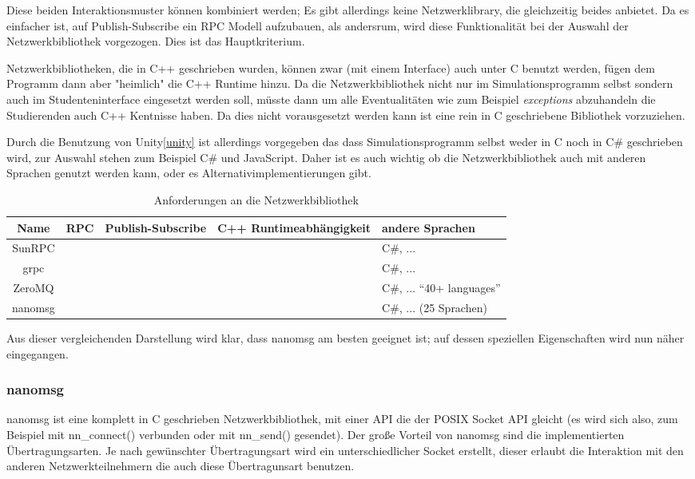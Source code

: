 Diese beiden Interaktionsmuster k{\"{o}}nnen kombiniert werden; Es gibt allerdings keine Netzwerklibrary, die gleichzeitig beides anbietet.
Da es einfacher ist, auf Publish-Subscribe ein RPC Modell aufzubauen, als andersrum, wird diese Funktionalit{\"{a}}t bei der Auswahl der
Netzwerkbibliothek vorgezogen. Dies ist das Hauptkriterium.

Netzwerkbibliotheken, die in C++ geschrieben wurden, k{\"{o}}nnen zwar (mit einem Interface) auch unter C benutzt 
werden, f{\"{u}}gen dem Programm dann aber "heimlich" die C++ Runtime hinzu. Da die Netzwerkbibliothek nicht
nur im Simulationsprogramm selbst sondern auch im Studenteninterface eingesetzt werden soll, m{\"{u}}sste dann
um alle Eventualit{\"{a}}ten wie zum Beispiel \textit{exceptions} abzuhandeln die Studierenden auch C++
Kentnisse haben. Da dies nicht vorausgesetzt werden kann ist eine rein in C geschriebene Bibliothek vorzuziehen.

Durch die Benutzung von Unity\ref{unity} ist allerdings vorgegeben das dass Simulationsprogramm selbst weder in C noch
in C\# geschrieben wird, zur Auswahl stehen zum Beispiel C\# und JavaScript. Daher ist es auch wichtig ob die Netzwerkbibliothek
auch mit anderen Sprachen genutzt werden kann, oder es Alternativimplementierungen gibt.

\clearpage %
\begin{table}[h]
\centering
\begin{tabu}{c | c | c | c | p{5cm}}
	\toprule
	Name & RPC & Publish-Subscribe & C++ Runtimeabh{\"{a}}ngigkeit & andere Sprachen \\
	\midrule
	SunRPC & \checkmark & \xmark & \checkmark & C\#, ... \\
	grpc\cite{grpc} & \checkmark & \xmark & \xmark & C\#, ... \\
	ZeroMQ\cite{zeromq} & \xmark & \checkmark & \xmark & C\#, ... \enquote{40+ languages} \\
	nanomsg\cite{nanomsg} & \xmark & \checkmark & \checkmark & C\#, ... (25 Sprachen) \\
	\bottomrule
\end{tabu}
\caption{Anforderungen an die Netzwerkbibliothek}
\end{table}

Aus dieser vergleichenden Darstellung wird klar, dass nanomsg am besten geeignet ist; auf dessen speziellen Eigenschaften wird nun n{\"{a}}her eingegangen.

\subsubsection{nanomsg}
nanomsg ist eine komplett in C geschrieben Netzwerkbibliothek, mit einer API die der POSIX Socket API gleicht (es wird sich also, zum Beispiel mit nn\_connect() verbunden oder mit nn\_send() gesendet).
Der gro{\ss}e Vorteil von nanomsg sind die implementierten {\"{U}}bertragungsarten. Je nach gew{\"{u}}nschter {\"{U}}bertragungsart wird ein unterschiedlicher Socket erstellt, dieser erlaubt die
Interaktion mit den anderen Netzwerkteilnehmern die auch diese {\"{U}}bertragunsart benutzen.

